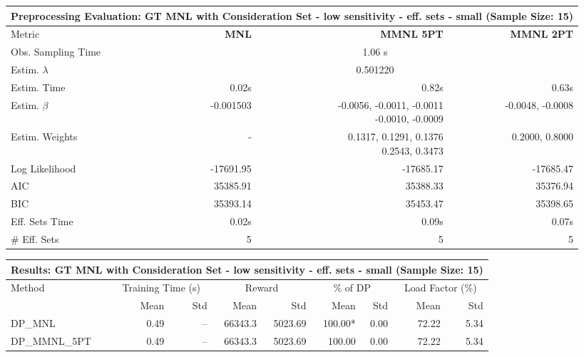 
\begin{samepage}
\begin{center}
  \small
  \begin{tabular}{l|r|r|r}
    \toprule
    \multicolumn{4}{c}{\textbf{Preprocessing Evaluation: GT MNL with Consideration Set - low sensitivity - eff. sets - small (Sample Size: 15)}} \\
    \midrule
    Metric & \textbf{MNL} & \textbf{MMNL 5PT} & \textbf{MMNL 2PT} \\
    \midrule
    Obs. Sampling Time & \multicolumn{3}{c}{1.06 s} \\
    Estim. $\lambda$ & \multicolumn{3}{c}{0.501220} \\
    Estim. Time & 0.02s & 0.82s & 0.63s \\
    Estim. $\beta$ & -0.001503 & \makecell[tr]{-0.0056, -0.0011, -0.0011 \\ -0.0010, -0.0009} & -0.0048, -0.0008 \\
    Estim. Weights & - & \makecell[tr]{0.1317, 0.1291, 0.1376 \\ 0.2543, 0.3473} & 0.2000, 0.8000 \\
    Log Likelihood & -17691.95 & -17685.17 & -17685.47 \\
    AIC & 35385.91 & 35388.33 & 35376.94 \\
    BIC & 35393.14 & 35453.47 & 35398.65 \\
    Eff. Sets Time & 0.02s & 0.09s & 0.07s \\
    \# Eff. Sets & 5 & 5 & 5 \\
    \bottomrule
  \end{tabular}
\end{center}
\begin{center}
  \small
  \begin{tabular}{l|rr|rr|rr|rr}
    \toprule
    \multicolumn{9}{c}{\textbf{Results: GT MNL with Consideration Set - low sensitivity - eff. sets - small (Sample Size: 15)}} \\
    \midrule
    Method & \multicolumn{2}{c|}{Training Time (s)} & \multicolumn{2}{c|}{Reward} & \multicolumn{2}{c|}{\% of DP} & \multicolumn{2}{c}{Load Factor (\%)} \\
    & Mean & Std & Mean & Std & Mean & Std & Mean & Std \\
    \midrule
    DP\_MNL      &     0.49 &    -- &    66343.3 &    5023.69 & 100.00* &    0.00 &   72.22 &    5.34 \\
    DP\_MMNL\_5PT &     0.49 &    -- &    66343.3 &    5023.69 &  100.00 &    0.00 &   72.22 &    5.34 \\

\end{tabular}
\end{center}
\end{samepage}
